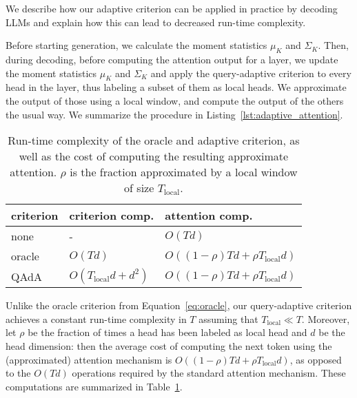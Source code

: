 We describe how our adaptive criterion can be applied in practice by decoding LLMs and explain how this can lead to decreased run-time complexity.

Before starting generation,  we calculate the moment statistics $\mu_K$ and $\Sigma_K$. Then, during decoding, before computing the attention output for a layer, we update the moment statistics $\mu_K$ and $\Sigma_K$ and apply the query-adaptive criterion to every head in the layer, thus labeling a subset of them as local heads. We approximate the output of those using a local window, and compute the output of the others the usual way. We summarize the procedure in Listing~\ref{lst:adaptive_attention}.



\begin{table}[t]
    \centering
    \begin{tabular}{lll}
        \toprule
        criterion & criterion comp. & attention comp. \\
        \midrule
        none&  -  & $O(Td)$ \\
        oracle &  $O(Td)$ & $O((1-\rho) Td +  \rho T_{\text{local}}d)$ \\
        QAdA &  $O(T_{\text{local}}d +d^2)$  &  $O( (1-\rho) Td + \rho T_{\text{local}}d)$  \\
        \bottomrule
    \end{tabular}
        \caption{\small Run-time complexity of the oracle and adaptive criterion, as well as the cost of computing the resulting approximate attention. $\rho$ is the fraction approximated by a local window of size $T_{\text{local}}$. }\vspace{-0.2in}
    \label{tab:complexity}
\end{table}

Unlike the oracle criterion from Equation~\eqref{eq:oracle}, our query-adaptive criterion achieves a constant run-time complexity in $T$ assuming that $T_{\text{local}} \ll T$. 
Moreover, let $\rho$ be the fraction of times a head has been labeled as local head and $d$ be the head dimension: then the average cost of computing the next token using the (approximated) attention mechanism  is $O((1-\rho)  Td + \rho  T_{\text{local}}d)$, as opposed to the $O(Td)$ operations required by the standard attention mechanism. These computations are summarized in Table~\ref{tab:complexity}.



















